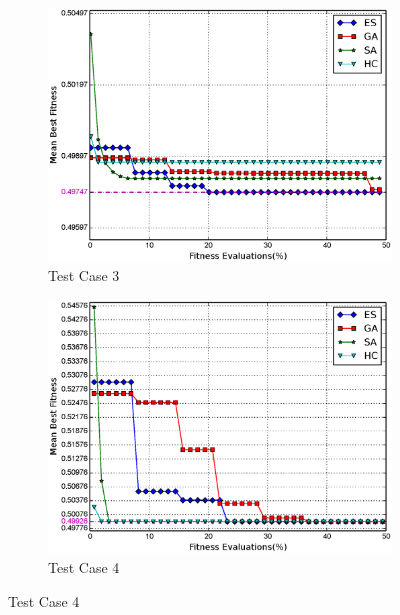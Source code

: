 \documentclass[conference]{IEEEtran}
\begin{document}
\begin{figure}
    \begin{subfigure}{\columnwidth}
        \includegraphics[width=\columnwidth]{FIG/tc3_mf.eps}%
        \caption{Test Case 3}%
        \label{fig:tc3_mf}%
    \end{subfigure}\hfill%
    \begin{subfigure}{\columnwidth}
        \includegraphics[width=\columnwidth]{FIG/tc4_mf.eps}%
        \caption{Test Case 4}%
        \label{fig:tc4_mf}%
    \end{subfigure}\hfill%
\end{figure}
 
\end{document}
